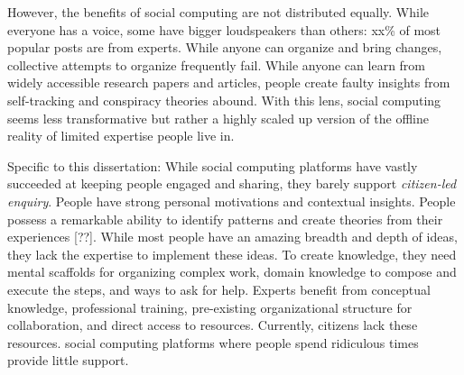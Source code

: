 However, the benefits of social computing are not distributed equally. While everyone has a voice, some have bigger loudspeakers than others: xx\% of most popular posts are from experts. While anyone can organize and bring changes, collective attempts to organize frequently fail. While anyone can learn from widely accessible research papers and articles, people create faulty insights from self-tracking and conspiracy theories abound. With this lens, social computing seems less transformative but rather a highly scaled up version of the offline reality of limited expertise people live in. 



Specific to this dissertation: While social computing platforms have vastly succeeded at keeping people engaged and sharing, they barely support \textit {citizen-led enquiry}. People have strong personal motivations and contextual insights. People possess a remarkable ability to identify patterns and create theories from their experiences [??]. While most people have an amazing breadth and depth of ideas, they lack the expertise to implement these ideas. To create knowledge, they need mental scaffolds for organizing complex work, domain knowledge to compose and execute the steps, and ways to ask for help. Experts benefit from conceptual knowledge, professional training, pre-existing organizational structure for collaboration, and direct access to resources. Currently, citizens lack these resources. social computing platforms where people spend ridiculous times provide little support. 



